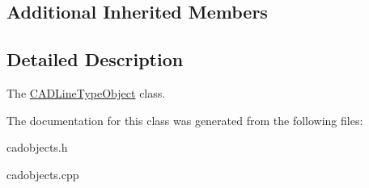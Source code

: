 \subsection*{Additional Inherited Members}


\subsection{Detailed Description}
The \hyperlink{class_c_a_d_line_type_object}{C\+A\+D\+Line\+Type\+Object} class. 

The documentation for this class was generated from the following files\+:\begin{DoxyCompactItemize}
\item 
cadobjects.\+h\item 
cadobjects.\+cpp\end{DoxyCompactItemize}
